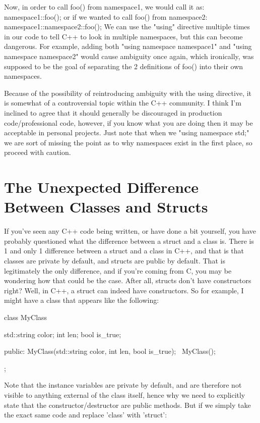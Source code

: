 \documentclass{article}
\begin{document}
Now, in order to call foo() from namespace1, we would call it as: namespace1::foo(); or if we wanted to call
foo() from namespace2: namespace1::namespace2::foo(); We can use the "using" directive multiple times in our
code to tell C++ to look in multiple namespaces, but this can become dangerous. For example, adding both
"using namespace namespace1" and "using namespace namespace2" would cause ambiguity once again, which
ironically, was supposed to be the goal of separating the 2 definitions of foo() into their own namespaces.

Because of the possibility of reintroducing ambiguity with the using directive, it is somewhat of a
controversial topic within the C++ community. I think I’m inclined to agree that it should generally be
discouraged in production code/professional code, however, if you know what you are doing then it may be
acceptable in personal projects. Just note that when we "using namespace std;" we are sort of missing the point
as to why namespaces exist in the first place, so proceed with caution.

\section{The Unexpected Difference Between Classes and Structs}

If you've seen any C++ code being written, or have done a bit yourself, you have probably questioned what the
difference between a struct and a class is. There is 1 and only 1 difference between a struct and a class in
C++, and that is that classes are private by default, and structs are public by default. That is legitimately
the only difference, and if you're coming from C, you may be wondering how that could be the case. After all,
structs don't have constructors right? Well, in C++, a struct can indeed have constructors. So for example, I
might have a class that appears like the following:

\begin{cpplst}

class MyClass
{
    std::string color;
    int len;
    bool is_true;

public:
    MyClass(std::string color, int len, bool is_true);
    ~MyClass();
};

\end{cpplst}

Note that the instance variables are private by default, and are therefore not visible to anything external of
the class itself, hence why we need to explicitly state that the constructor/destructor are public methods. But
if we simply take the exact same code and replace 'class' with 'struct':
\end{document}
